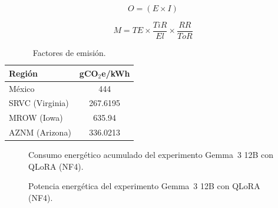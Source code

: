 \documentclass[twocolumn]{article}
\begin{document}
\begin{equation}
    O = (E \times I)
    \label{eq:operational_emissions}
\end{equation}

\begin{equation}
    M = TE \times \frac{TiR}{El} \times \frac{RR}{ToR}
    \label{eq:embodied_emissions}
\end{equation}

\begin{table}[htbp]
    \centering
    \caption{Factores de emisión.}
    \label{tab:region_emissions}
    \begin{tabular}{lc}
    \toprule
    \textbf{Región} & \textbf{gCO$_2$e/kWh}\\
    \midrule
    México & 444 \\
    SRVC (Virginia) & 267.6195 \\
    MROW (Iowa) & 635.94 \\
    AZNM (Arizona) & 336.0213 \\
    \bottomrule
    \end{tabular}
\end{table}

\begin{figure}[htbp]
    \centering
    \caption{Consumo energético acumulado del experimento Gemma~3 12B con QLoRA (NF4).}
    \label{fig:energy_consumption}
    \resizebox{\columnwidth}{!}{}
\end{figure}

\begin{figure}[htbp]
    \centering
    \caption{Potencia energética del experimento Gemma~3 12B con QLoRA (NF4).}
    \label{fig:power_consumption}
    \resizebox{\columnwidth}{!}{}
\end{figure}


\end{document}
